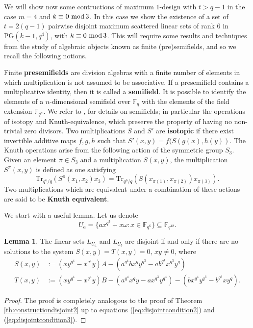\documentclass[11pt]{amsart}
\theoremstyle{definition}
\newtheorem{lemma}[theorem]{Lemma}
\newcommand{\fqn}{\mathbb{F}_{q^n}}
\newcommand{\F}{{\mathbb F}}
\renewcommand{\mod}{\hbox{{\rm mod}\,}}
\newcommand{\PG}{\mathrm{PG}}
\begin{document}
{We will show now some contructions of maximum $1$-design with $t>q-1$ in the case $m=4$ and $k \equiv 0 \ \mod 3$. In this case we show the existence of a set of $t=2(q-1)$ pairwise disjoint maximum scattered linear sets of rank $6$ in $\PG(k-1,q^4)$, with $k \equiv 0 \ \mod 3$. This will require some results and techniques from the study of algebraic objects known as finite (pre)semifields, and so we recall the following notions.

Finite \textbf{presemifields} are division algebras with a finite number of elements in which multiplication is not assumed to be associative. If a presemifield contains a multiplicative identity, then
it is called a \textbf{semifield}.
It is possible to identify the elements of a $n$-dimensional semifield over $\F_q$ with the elements of the
field extension $\fqn$.  We refer to \cite{lavrauw2011finite}, for details on semifields; in particular the operations of isotopy and Knuth-equivalence, which preserve the property of having no non-trivial zero divisors. Two multiplications $S$ and $S'$ are \textbf{isotopic} if there exist invertible additive maps $f,g,h$ such that $S'(x,y)= f(S(g(x),h(y))$. The Knuth operations arise from the following action of the symmetric group $S_3$. Given an element $\pi\in S_3$ and a multiplication $S(x,y)$, the multiplication $S^\pi(x,y)$ is defined as one satisfying 
\[
\mathrm{Tr}_{q^6/q}(S^{\pi}(x_1,x_2)x_3) = \mathrm{Tr}_{q^6/q}(S(x_{\pi(1)},x_{\pi(2)})x_{\pi(3)}).
\]
Two multiplications which are equivalent under a combination of these actions are said to be \textbf{ Knuth equivalent}.

}

We start with a useful lemma. Let us denote 
\[U_a=\{ ax^{q^3}+x\omega \colon x \in  \F_{q^{6}}\} \subseteq \F_{q^{12}}.\]

\begin{lemma} \label{lem:existence1designdouble}
The linear sets $L_{U_a}$ and $L_{U_b}$ are disjoint if and only if there are no solutions to the system $S(x,y)=T(x,y)=0$, $xy\ne 0$, where
\begin{align*} S(x,y)&:= (xy^{q^{4}}-x^{q^{4}}y)A-(a^{q^4}bx^{q}y^{q^3}-ab^{q^4}x^{q^3}y^{q})\\
T(x,y)&:= 
(xy^{q^{4}}-x^{q^{4}}y)B- (a^{q^{4}}x^{q}y-ax^{q^3}y^{q^{4}})-(bx^{q^{4}} y^{q^3}-b^{q^4}xy^{q}).
\end{align*}
\end{lemma}

\begin{proof}
The proof is completely analogous to the proof of Theorem \ref{th:constructiondisjoint2} up to equations (\ref{eq:disjointcondition2}) and (\ref{eq:disjointcondition3}).
\end{proof}
\end{document}
